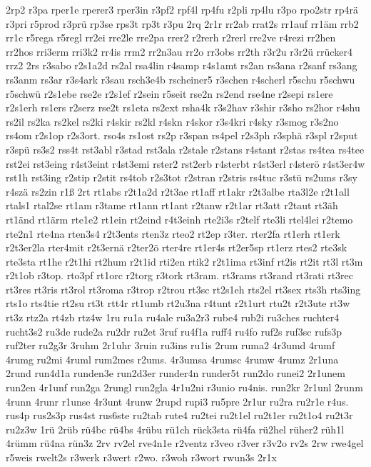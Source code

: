 {2rp2
r3pa
rper1e
rperer3
rper3in
r3pf2
rpf4l
rp4fu
r2pli
rp4lu
r3po
rpo2str
rp4rä
r3pri
r5prod
r3prü
rp3se
rps3t
rp3t
r3pu
2rq
2r1r
rr2ab
rrat2s
rr1auf
rr1äm
rrb2
rr1c
r5rega
r5regl
rr2ei
rre2le
rre2pa
rrer2
r2rerh
r2rerl
rre2ve
r4rezi
rr2hen
rr2hos
rri3erm
rri3k2
rr4is
rrm2
rr2n3au
rr2o
rr3obs
rr2th
r3r2u
r3r2ü
rrücker4
rrz2
2rs
r3sabo
r2s1a2d
rs2al
rsa4lin
r4samp
r4s1amt
rs2an
rs3ana
r2sanf
rs3ang
rs3anm
rs3ar
r3s4ark
r3sau
rsch3e4b
rscheiner5
r3schen
r4scherl
r5schu
r5schwu
r5schwü
r2s1ebe
rse2e
r2s1ef
r2sein
r5seit
rse2n
rs2end
rse4ne
r2sepi
rs1ere
r2s1erh
rs1ers
r2serz
rse2t
rs1eta
rs2ext
rsha4k
r3s2hav
r3shir
r3sho
rs2hor
r4shu
rs2il
rs2ka
rs2kel
rs2ki
r4skir
rs2kl
r4skn
r4skor
r3s4kri
r4sky
r3smog
r3s2no
rs4om
r2s1op
r2s3ort.
rso4s
rs1ost
rs2p
r3span
rs4pel
r2s3ph
r3sphä
r3spl
r2sput
r3spü
rs3s2
rss4t
rst3abl
r3stad
rst3ala
r2stale
r2stans
r4stant
r2stas
rs4tea
rs4tee
rst2ei
rst3eing
r4st3eint
r4st3emi
rster2
rst2erb
r4sterbt
r4st3erl
r4sterö
r4st3er4w
rst1h
rst3ing
r2stip
r2stit
rs4tob
r2s3tot
r2stran
r2stris
rs4tuc
r3stü
rs2ums
r3sy
r4szä
rs2zin
r1ß
2rt
rt1abs
r2t1a2d
r2t3ae
rt1aff
rt1akr
r2t3albe
rta3l2e
r2t1all
rtals1
rtal2se
rt1am
r3tame
rt1ann
rt1ant
r2tanw
r2t1ar
rt3att
r2taut
rt3äh
rt1änd
rt1ärm
rte1e2
rt1ein
rt2eind
r4t3einh
rte2i3s
r2telf
rte3li
rtel4lei
r2temo
rte2n1
rte4na
rten3s4
r2t3ents
rten3z
rteo2
rt2ep
r3ter.
rter2fa
rt1erh
rt1erk
r2t3er2la
rter4mit
r2t3ernä
r2ter2ö
rter4re
rt1er4s
rt2er5sp
rt1erz
rtes2
rte3sk
rte3sta
rt1he
r2t1hi
rt2hum
r2t1id
rti2en
rtik2
r2t1ima
rt3inf
rt2is
rt2it
rt3l
rt3m
r2t1ob
r3top.
rto3pf
rt1orc
r2torg
r3tork
rt3ram.
rt3rams
rt3rand
rt3rati
rt3rec
rt3res
rt3ris
rt3rol
rt3roma
r3trop
r2trou
rt3sc
rt2s1eh
rts2el
rt3sex
rts3h
rts3ing
rts1o
rts4tie
rt2su
rt3t
rtt4r
rt1umb
rt2u3na
r4tunt
r2t1urt
rtu2t
r2t3ute
rt3w
rt3z
rtz2a
rt4zb
rtz4w
1ru
ru1a
ru4ale
ru3a2r3
rube4
rub2i
ru3ches
ruchter4
rucht3s2
ru3de
rude2a
ru2dr
ru2et
3ruf
ru4f1a
ruff4
ru4fo
ruf2s
ruf3sc
rufs3p
ruf2ter
ru2g3r
3ruhm
2r1uhr
3ruin
ru3ins
ru1is
2rum
ruma2
4r3umd
4rumf
4rumg
ru2mi
4ruml
rum2mes
r2ums.
4r3umsa
4rumsc
4rumw
4rumz
2r1una
2rund
run4d1a
runden3e
run2d3er
runder4n
runder5t
run2do
runei2
2r1unem
run2en
4r1unf
run2ga
2rungl
run2gla
4r1u2ni
r3unio
ru4nis.
run2kr
2r1unl
2runm
4runn
4runr
r1unse
4r3unt
4runw
2rupd
rupi3
ru5pre
2r1ur
ru2ra
ru2r1e
r4us.
rus4p
rus2s3p
rus4st
rus6ste
ru2tab
rute4
ru2tei
ru2t1el
ru2t1er
ru2t1o4
ru2t3r
ru2z3w
1rü
2rüb
rü4bc
rü4bs
4rübu
rü1ch
rück3sta
rü4fa
rü2hel
rüher2
rüh1l
4rümm
rü4na
rün3z
2rv
rv2el
rve4n1e
r2ventz
r3veo
r3ver
r3v2o
rv2s
2rw
rwe4gel
r5weis
rwelt2s
r3werk
r3wert
r2wo.
r3woh
r3wort
rwun3s
2r1x
}
